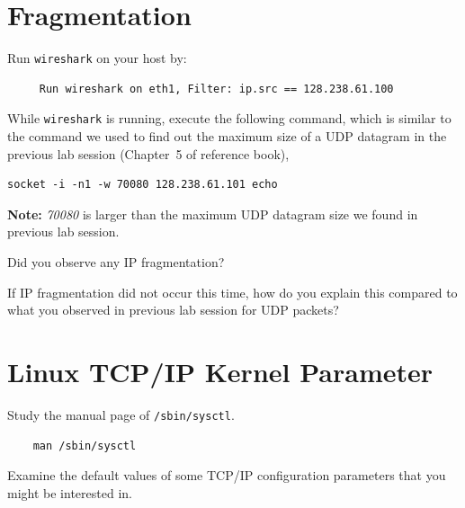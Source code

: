 \documentclass{UTNetLab}
\begin{document}
\section{Fragmentation}
    Run \lstinline{wireshark} on your host by:
		
     \begin{lstlisting}
     Run wireshark on eth1, Filter: ip.src == 128.238.61.100
     \end{lstlisting}  

    While \lstinline{wireshark} is running, execute the following command, which is similar to the command we used to find out the maximum size of a UDP datagram in the previous lab session (Chapter~5 of reference book),
	
	\begin{lstlisting}[emph={n, h1,netlab}]
	socket -i -n1 -w 70080 128.238.61.101 echo
    \end{lstlisting}
    
   \textbf{Note:}  \textit{70080} is larger than the maximum UDP datagram size we found in previous lab session.



    \begin{report}
        \item Did you observe any IP fragmentation?
            
        \item If IP fragmentation did not occur this time, how do you explain this compared to what you observed in previous lab session for UDP packets?
    \end{report}

\section{Linux TCP/IP Kernel Parameter}
    Study the manual page of \lstinline{/sbin/sysctl}.
    
	\begin{lstlisting}
	man /sbin/sysctl
	\end{lstlisting}
	
    Examine the default values of some TCP/IP configuration parameters that you might be interested in.
    
\end{document}
